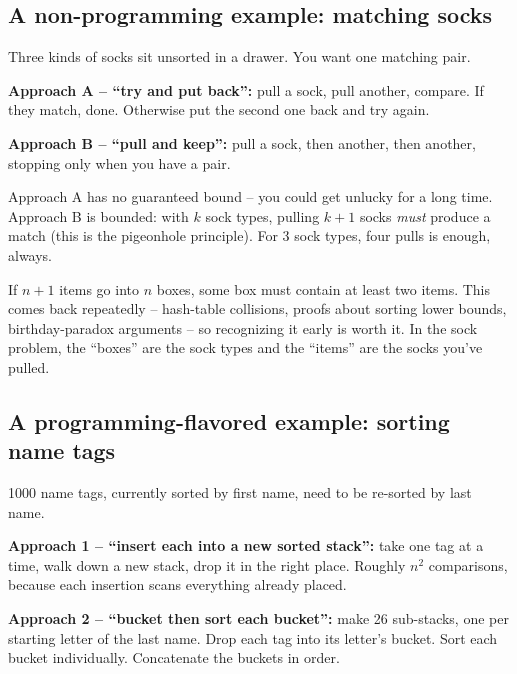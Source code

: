 \documentclass[11pt]{article}
\begin{document}
\subsection{A non-programming example: matching socks}

Three kinds of socks sit unsorted in a drawer. You want one matching
pair.

\begin{examplebox}
\textbf{Approach A -- ``try and put back'':} pull a sock, pull another,
compare. If they match, done. Otherwise put the second one back and
try again.

\textbf{Approach B -- ``pull and keep'':} pull a sock, then another,
then another, stopping only when you have a pair.

Approach A has no guaranteed bound -- you could get unlucky for a
long time. Approach B is bounded: with $k$ sock types, pulling
$k + 1$ socks \emph{must} produce a match (this is the pigeonhole
principle). For 3 sock types, four pulls is enough, always.
\end{examplebox}

\begin{notebox}
If $n+1$ items go into $n$ boxes, some box must contain at least
two items. This comes back repeatedly -- hash-table collisions, proofs
about sorting lower bounds, birthday-paradox arguments -- so
recognizing it early is worth it. In the sock problem, the ``boxes''
are the sock types and the ``items'' are the socks you've pulled.
\end{notebox}

\subsection{A programming-flavored example: sorting name tags}

1000 name tags, currently sorted by first name, need to be re-sorted
by last name.

\begin{examplebox}
\textbf{Approach 1 -- ``insert each into a new sorted stack'':}
take one tag at a time, walk down a new stack, drop it in the right
place. Roughly $n^2$ comparisons, because each insertion scans
everything already placed.

\textbf{Approach 2 -- ``bucket then sort each bucket'':}
make 26 sub-stacks, one per starting letter of the last name. Drop
each tag into its letter's bucket. Sort each bucket individually.
Concatenate the buckets in order.
\end{examplebox}
\end{document}
